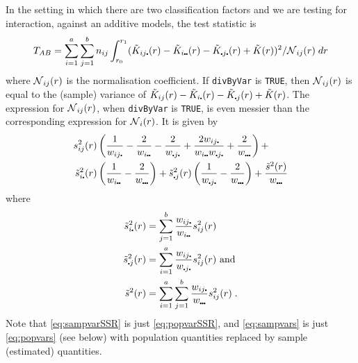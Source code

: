 \documentclass[12pt]{article}
\newcommand{\pt}{\mbox{\scalebox{0.4}{$\bullet$}}}
\newcommand{\tils}{\mbox{$\tilde{s}$}}
\newcommand{\sco}{\mbox{$\cal N$}}
\begin{document}
In the setting in which there are two classification factors and
we are testing for interaction, against an additive models, the
test statistic is
\[
T_{AB} = \sum_{i=1}^a \sum_{j=1}^b n_{ij} \int_{r_0}^{r_1} (\tilde{K}_{ij \pt}(r) -
   \tilde{K}_{i \pt \pt}(r) - \tilde{K}_{\pt j \pt}(r) +
   \tilde{K}(r))^2/\sco_{ij}(r) \; dr
\]
where $\sco_{ij}(r)$ is the normalisation coefficient.  If
\texttt{divByVar} is \texttt{TRUE}, then $\sco_{ij}(r)$ is equal to
the (sample) variance of $\tilde{K}_{ij}(r) - \tilde{K}_{i\pt}(r)
- \tilde{K}_{\pt j}(r) + \tilde{K}(r)$.  The expression for
$\sco_{ij}(r)$, when \texttt{divByVar} is \texttt{TRUE}, is
even messier than the corresponding expression for $\sco_{i}(r)$.
It is given by
\begin{equation}
\label{eq:sampvarSSR}
\begin{split}
s_{ij}^2(r) &\left ( \frac{1}{w_{i j \pt}} -
                                      \frac{2}{w_{i \pt \pt}} -
                                      \frac{2}{w_{\pt j \pt}} +
                                      \frac{2w_{ij \pt}}{w_{i \pt \pt} w_{\pt j \pt}} +
                                      \frac{2}{w_{\pt \pt \pt}} \right )+ \\
               \tils^2_{i \pt}(r) &\left ( \frac{1}{w_{i \pt \pt}} -
                                   \frac{2}{w_{\pt \pt \pt}} \right )+
               \tils^2_{\pt j}(r) \left (\frac{1}{w_{\pt j \pt}} -
                                   \frac{2}{w_{\pt \pt \pt}} \right )+
                            \frac{\tilde{s}^2(r)}{w_{\pt \pt \pt}}
\end{split}
\end{equation}
where
\begin{equation}
\label{eq:sampvars}
\begin{split}
\tils_{i \pt}^2(r) &= \sum_{j=1}^b \frac{w_{ij \pt}}{w_{i \pt \pt}} s^2_{ij}(r) \\
\tils_{\pt j}^2(r) &= \sum_{i=1}^a \frac{w_{ij \pt}}{w_{\pt j \pt}} s^2_{ij}(r)
                        \mbox{~and}\\
\tils^2(r) &= \sum_{i=1}^a \sum_{j=1}^b \frac{w_{i j \pt}}{w_{\pt \pt \pt}}
                                          s^2_{ij}(r) \; .
\end{split}
\end{equation}
Note that \eqref{eq:sampvarSSR} is just \eqref{eq:popvarSSR},
and \eqref{eq:sampvars} is just \eqref{eq:popvars} (see below)
with population quantities replaced by sample (estimated) quantities.
\end{document}
